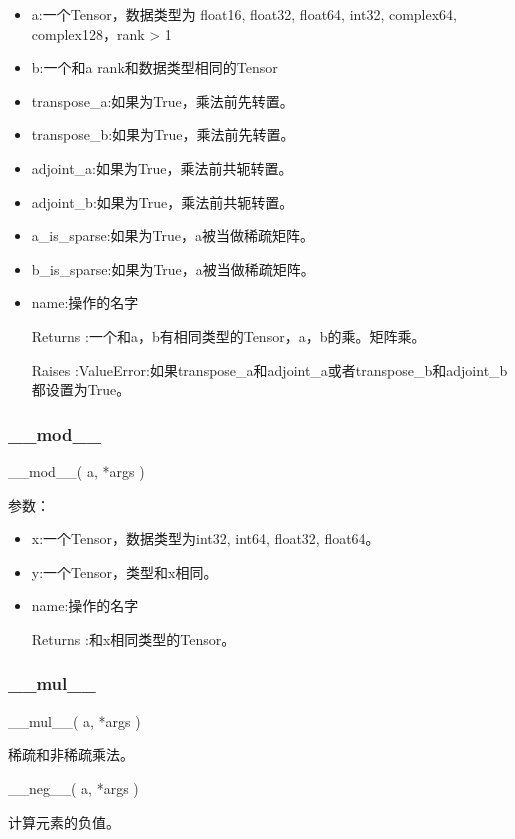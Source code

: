 \begin{itemize}
	\item a:一个Tensor，数据类型为 float16, float32, float64, int32, complex64, complex128，rank > 1
	\item b:一个和a rank和数据类型相同的Tensor
	\item transpose\_a:如果为True，乘法前先转置。
	\item transpose\_b:如果为True，乘法前先转置。
	\item adjoint\_a:如果为True，乘法前共轭转置。
	\item adjoint\_b:如果为True，乘法前共轭转置。
	\item a\_is\_sparse:如果为True，a被当做稀疏矩阵。
	\item b\_is\_sparse:如果为True，a被当做稀疏矩阵。
	\item name:操作的名字
	\item[Returns]:一个和a，b有相同类型的Tensor，a，b的乘。矩阵乘。
	\item[Raises]:ValueError:如果transpose\_a和adjoint\_a或者transpose\_b和adjoint\_b都设置为True。
	\end{itemize}
\subsubsection{\_\_mod\_\_}
\begin{python}
__mod__(
    a,
    *args
)
\end{python}
参数：

\begin{itemize}
	\item x:一个Tensor，数据类型为int32, int64, float32, float64。
	\item y:一个Tensor，类型和x相同。
	\item name:操作的名字
	\item[Returns]:和x相同类型的Tensor。
\end{itemize}
\subsubsection{\_\_mul\_\_}
\begin{python}
__mul__(
    a,
    *args
)
\end{python}
稀疏和非稀疏乘法。
\begin{python}
__neg__(
    a,
    *args
)
\end{python}
计算元素的负值。

